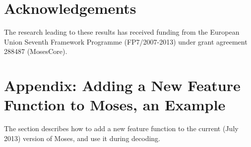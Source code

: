 \documentclass{pbml}
\begin{document}


\section*{Acknowledgements}

The research leading to these results has received funding from the European Union Seventh Framework Programme (FP7/2007-2013) under grant agreement 288487 (MosesCore).




\section*{Appendix: Adding a New Feature Function to Moses, an Example}
\label{Appendix}

The section describes how to add a new feature function to the current (July 2013) version of Moses, and use it during decoding.
\end{document}
